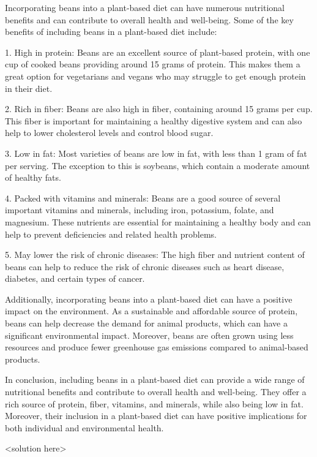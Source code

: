 \question Incorporating beans into a plant-based diet can have numerous nutritional benefits and can contribute to overall health and well-being. Some of the key benefits of including beans in a plant-based diet include:

1. High in protein: Beans are an excellent source of plant-based protein, with one cup of cooked beans providing around 15 grams of protein. This makes them a great option for vegetarians and vegans who may struggle to get enough protein in their diet.

2. Rich in fiber: Beans are also high in fiber, containing around 15 grams per cup. This fiber is important for maintaining a healthy digestive system and can also help to lower cholesterol levels and control blood sugar.

3. Low in fat: Most varieties of beans are low in fat, with less than 1 gram of fat per serving. The exception to this is soybeans, which contain a moderate amount of healthy fats.

4. Packed with vitamins and minerals: Beans are a good source of several important vitamins and minerals, including iron, potassium, folate, and magnesium. These nutrients are essential for maintaining a healthy body and can help to prevent deficiencies and related health problems.

5. May lower the risk of chronic diseases: The high fiber and nutrient content of beans can help to reduce the risk of chronic diseases such as heart disease, diabetes, and certain types of cancer.

Additionally, incorporating beans into a plant-based diet can have a positive impact on the environment. As a sustainable and affordable source of protein, beans can help decrease the demand for animal products, which can have a significant environmental impact. Moreover, beans are often grown using less resources and produce fewer greenhouse gas emissions compared to animal-based products.

In conclusion, including beans in a plant-based diet can provide a wide range of nutritional benefits and contribute to overall health and well-being. They offer a rich source of protein, fiber, vitamins, and minerals, while also being low in fat. Moreover, their inclusion in a plant-based diet can have positive implications for both individual and environmental health.
\begin{solution}
<solution here>
\end{solution}
